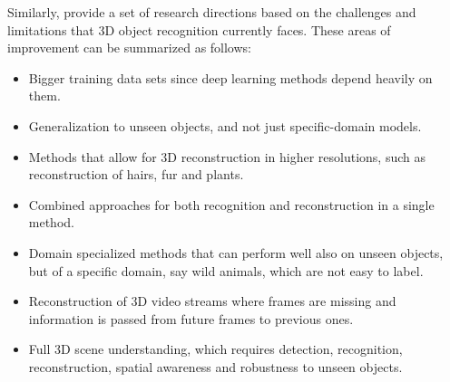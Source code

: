 Similarly, \citeauthor{han2019image} provide a set of research directions based on the challenges and limitations that 3D object recognition currently faces. These areas of improvement can be summarized as follows:
\begin{itemize}
    \item Bigger training data sets since deep learning methods depend heavily on them. 
    \item Generalization to unseen objects, and not just specific-domain models.
    \item Methods that allow for 3D reconstruction in higher resolutions, such as reconstruction of hairs, fur and plants.
    \item Combined approaches for both recognition and reconstruction in a single method.
    \item Domain specialized methods that can perform well also on unseen objects, but of a specific domain, say wild animals, which are not easy to label.
    \item Reconstruction of 3D video streams where frames are missing and information is passed from future frames to previous ones.
    \item Full 3D scene understanding, which requires detection, recognition, reconstruction, spatial awareness and robustness to unseen objects.
\end{itemize}

    




